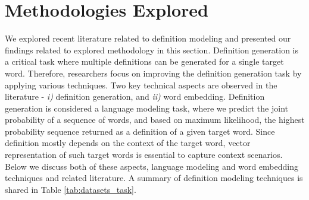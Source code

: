 \section{Methodologies Explored}
We explored recent literature related to definition modeling and presented our
findings related to explored methodology in this section. Definition generation
is a critical task where multiple definitions can be generated for a single
target word. Therefore, researchers focus on improving the definition generation
task by applying various techniques. Two key technical aspects are observed in
the literature -\emph{ i)} definition generation, and \emph{ii)} word embedding.
Definition generation is considered a language modeling task, where we predict
the joint probability of a  sequence of words, and based on maximum likelihood,
the highest probability sequence returned as a definition of a given target
word. Since definition mostly depends on the context of the target word, vector
representation of such target words is essential to capture context scenarios.
Below we discuss both of these aspects, language modeling and word embedding
techniques and related literature. A summary of definition modeling techniques
is shared in Table \ref{tab:datasets_task}.

